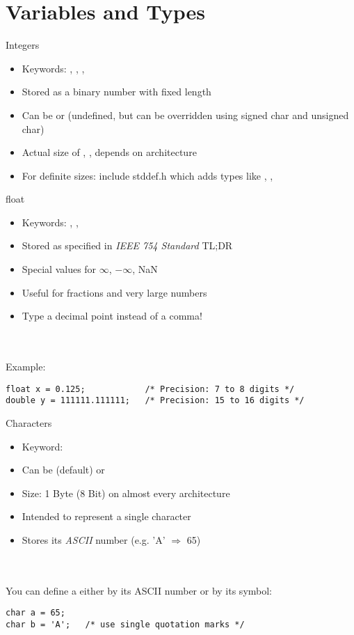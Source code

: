 \documentclass[10pt,graphics,aspectratio=169,table]{beamer}
\begin{document}
\section{Variables and Types}
\begin{frame}{Integers}
	\begin{itemize}
        \item Keywords: , , , 
		\item Stored as a binary number with fixed length
        \item Can be  or  (undefined, but can be overridden using signed char and unsigned char)
		\item Actual size of , ,  depends on architecture
        \item For definite sizes: include stddef.h which adds types like , , 
	\end{itemize}
\end{frame}
\begin{frame}[fragile]{float}
\begin{itemize}
		\item Keywords: , , 
		\item Stored as specified in \textit{IEEE 754 Standard} TL;DR
		\item Special values for $\infty$, $-\infty$, NaN
		\item Useful for fractions and very large numbers
		\item Type a decimal point instead of a comma!
	\end{itemize}\ \\
	\ \\
	Example:
	\begin{lstlisting}[numbers=none]
float x = 0.125;			/* Precision: 7 to 8 digits */
double y = 111111.111111;	/* Precision: 15 to 16 digits */
\end{lstlisting}
\end{frame}
\begin{frame}[fragile]{Characters}
	\begin{itemize}
		\item Keyword: 
		\item Can be (default) or 	
		\item Size: 1 Byte (8 Bit) on almost every architecture
		\item Intended to represent a single character
		\item Stores its \textit{ASCII} number (e.g. 'A' $\Rightarrow$ 65)
	\end{itemize}\ \\
	\ \\
	You can define a  either by its ASCII number or by its symbol:
	\begin{lstlisting}[numbers=none]
char a = 65;
char b = 'A';	/* use single quotation marks */
\end{lstlisting}
\end{frame}
\end{document}
